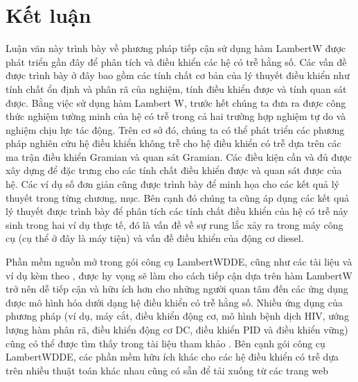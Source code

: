 \chapter{Kết luận}
\setlength{\parindent}{6.5ex}

Luận văn này trình bày về phương pháp tiếp cận sử dụng hàm LambertW được phát triển gần đây để phân tích và điều khiển các hệ có trễ hằng số. 
Các vấn đề được trình bày ở đây bao gồm các tính chất cơ bản của lý thuyết điều khiển như tính chất ổn định và phân rã của nghiệm, tính điều khiển được và tính quan sát được. Bằng việc sử dụng hàm Lambert W, trước hết chúng ta đưa ra được công thức nghiệm tường minh của hệ có trễ trong cả hai trường hợp nghiệm tự do và nghiệm chịu lực tác động. 
%
Trên cơ sở đó, chúng ta có thể phát triển các phương pháp nghiên cứu hệ điều khiển không trễ cho hệ điều khiển có trễ dựa trên các ma trận điều khiển Gramian và quan sát Gramian. Các điều kiện cần và đủ được xây dựng để
đặc trưng cho các tính chất điều khiển được và quan sát được của hệ.
Các ví dụ số đơn giản cũng được trình bày để minh họa cho các kết quả lý thuyết trong từng chương, mục. 
%
Bên cạnh đó chúng ta cũng áp dụng các kết quả lý thuyết được trình bày để phân tích các tính chất điều khiển của hệ có trễ nảy sinh trong hai ví dụ thực tế, đó là vấn đề về sự rung lắc xảy ra trong máy công cụ (cụ thể ở đây là máy tiện) và vấn đề điều khiển của động cơ diesel. 

Phần mềm nguồn mở trong gói công cụ LambertWDDE, cũng như các tài liệu và ví dụ kèm theo \cite{Dua10}, được hy vọng sẽ làm cho cách tiếp cận dựa trên hàm LambertW trở nên dễ tiếp cận và hữu ích hơn cho những người quan tâm đến các ứng dụng được mô hình hóa dưới dạng hệ điều khiển có trễ hằng số.
Nhiều ứng dụng của phương pháp (ví dụ, máy cắt, điều khiển động cơ, mô hình bệnh dịch HIV, ướng lượng hàm  phân rã, điều khiển động cơ DC, điều khiển PID và điều khiển vững) cũng có thể được tìm thấy trong tài liệu tham khảo \cite{Du12,Yi13, Yi07, Yi08, YiOc08, YiEig10,Yi10} . Bên cạnh gói công cụ LambertWDDE, các phần mềm hữu ích khác cho các hệ điều khiển có trễ dựa trên nhiều thuật toán khác nhau cũng có sẵn để tải xuống từ các trang web \cite{Bre09, Eng01, Vyh09,OlgS02}
